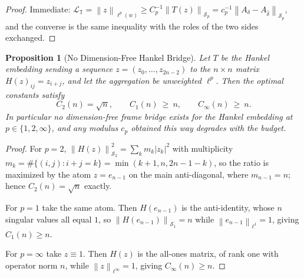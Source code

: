 \documentclass[12pt]{article}
\newtheorem{proposition}[theorem]{Proposition}
\theoremstyle{definition}
\newcommand{\norm}[1]{\left\lVert#1\right\rVert}
\newcommand{\Sp}[1]{\mathcal S_{#1}}
\begin{document}
\begin{proof}
Immediate: $\mathcal L_{\mathbb T}=\norm{z}_{\ell^p(w)}\ge
C_p^{-1}\norm{T(z)}_{\Sp p}=c_p^{-1}\norm{A_\delta-A_{\widehat\delta}}_{\Sp p}$,
and the converse is the same inequality with the roles of the two sides
exchanged.
\end{proof}

\begin{proposition}[No Dimension-Free Hankel Bridge]
\label{prop:no-dimension-free-bridge}
Let $T$ be the Hankel embedding sending a sequence $z=(z_0,\dots,z_{2n-2})$ to
the $n\times n$ matrix $H(z)_{ij}=z_{i+j}$, and let the aggregation be
unweighted $\ell^p$.  Then the optimal constants satisfy
\[
C_2(n)=\sqrt n,
\qquad
C_1(n)\ \ge\ n,
\qquad
C_\infty(n)\ \ge\ n .
\]
In particular no dimension-free frame bridge exists for the Hankel embedding at
$p\in\{1,2,\infty\}$, and any modulus $c_p$ obtained this way degrades with the
budget.
\end{proposition}

\begin{proof}
For $p=2$, $\norm{H(z)}_{\Sp2}^2=\sum_k m_k|z_k|^2$ with multiplicity
$m_k=\#\{(i,j):i+j=k\}=\min(k+1,n,2n-1-k)$, so the ratio is maximized by the
atom $z=e_{n-1}$ on the main anti-diagonal, where $m_{n-1}=n$; hence
$C_2(n)=\sqrt n$ exactly.

For $p=1$ take the same atom.  Then $H(e_{n-1})$ is the anti-identity, whose
$n$ singular values all equal $1$, so $\norm{H(e_{n-1})}_{\Sp1}=n$ while
$\norm{e_{n-1}}_{\ell^1}=1$, giving $C_1(n)\ge n$.

For $p=\infty$ take $z\equiv1$.  Then $H(z)$ is the all-ones matrix, of rank
one with operator norm $n$, while $\norm{z}_{\ell^\infty}=1$, giving
$C_\infty(n)\ge n$.
\end{proof}
\end{document}
